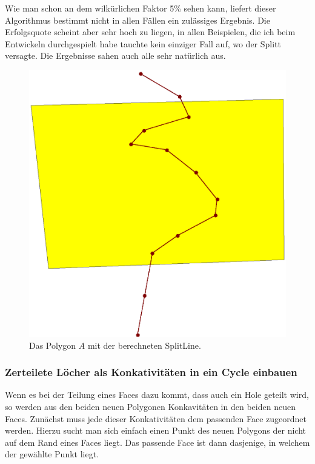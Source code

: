 Wie man schon an dem wilkürlichen Faktor 5\% sehen kann, liefert dieser Algorithmus bestimmt nicht in allen Fällen ein zulässiges Ergebnis. Die Erfolgsquote scheint aber sehr hoch zu liegen, in allen Beispielen, die ich beim Entwickeln durchgespielt habe tauchte kein einziger Fall auf, wo der Splitt versagte. Die Ergebnisse sahen auch alle sehr natürlich aus.


\begin{figure}
	\centering
	\includegraphics[scale=0.6]{Ergebnis.eps}
	\caption{Das Polygon $A$ mit der berechneten SplitLine.}
	\label{fig:SplitLine}
\end{figure}


\subsubsection{Zerteilete Löcher als Konkativitäten in ein Cycle einbauen}\label{JoinLL}

Wenn es bei der Teilung eines Faces dazu kommt, dass auch ein Hole geteilt wird, so werden aus den beiden neuen Polygonen Konkavitäten in den beiden neuen Faces. Zunächst muss jede dieser Konkativitäten dem passenden Face zugeordnet werden. Hierzu sucht man sich einfach einen Punkt des neuen Polygons der nicht auf dem Rand eines Faces liegt. Das passende Face ist dann dasjenige, in welchem der gewählte Punkt liegt. 

